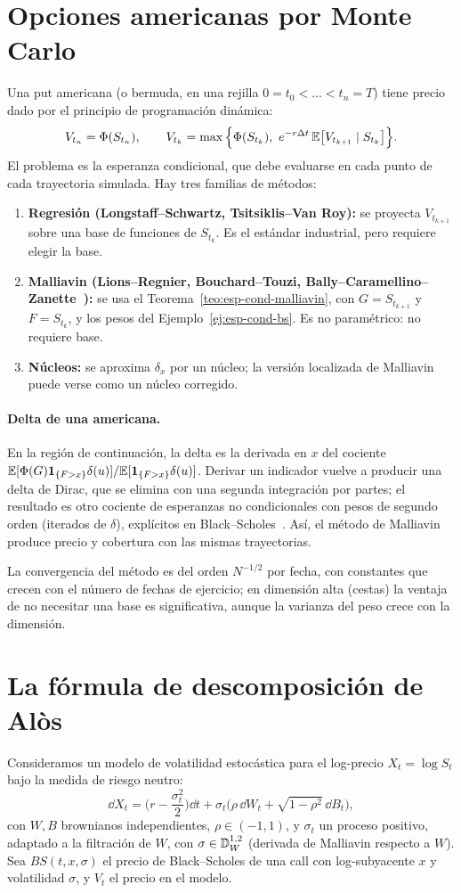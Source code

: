 \section{Opciones americanas por Monte Carlo}
Una put americana (o bermuda, en una rejilla $0=t_0<\dots<t_n=T$) tiene precio dado por el
principio de programación dinámica:
\[
  V_{t_n}=\Phi(S_{t_n}),\qquad V_{t_k}=\max\Big\{\Phi(S_{t_k}),\ e^{-r\Delta t}\,\mathbb{E}\big[V_{t_{k+1}}\mid S_{t_k}\big]\Big\}.
\]
El problema es la esperanza condicional, que debe evaluarse en cada punto de cada trayectoria
simulada. Hay tres familias de métodos:
\begin{enumerate}
  \item \textbf{Regresión (Longstaff--Schwartz, Tsitsiklis--Van Roy):} se proyecta $V_{t_{k+1}}$ sobre una
  base de funciones de $S_{t_k}$. Es el estándar industrial, pero requiere elegir la base.
  \item \textbf{Malliavin (Lions--Regnier, Bouchard--Touzi, Bally--Caramellino--Zanette~\cite{BallyCaramellinoZanette05}):}
  se usa el Teorema~\ref{teo:esp-cond-malliavin}, con $G=S_{t_{k+1}}$ y $F=S_{t_k}$, y los pesos del Ejemplo~\ref{ej:esp-cond-bs}. Es no
  paramétrico: no requiere base.
  \item \textbf{Núcleos:} se aproxima $\delta_x$ por un núcleo; la versión localizada de Malliavin puede verse
  como un núcleo corregido.
\end{enumerate}

\paragraph{Delta de una americana.} En la región de continuación, la delta es la derivada en $x$ del
cociente $\mathbb{E}[\Phi(G)\mathbf{1}_{\{F>x\}}\delta(u)]/\mathbb{E}[\mathbf{1}_{\{F>x\}}\delta(u)]$. Derivar un indicador vuelve a producir una delta
de Dirac, que se elimina con una segunda integración por partes; el resultado es otro cociente
de esperanzas no condicionales con pesos de segundo orden (iterados de $\delta$), explícitos en
Black--Scholes~\cite{BallyCaramellinoZanette05}. Así, el método de Malliavin produce precio y cobertura con las mismas
trayectorias.

La convergencia del método es del orden $N^{-1/2}$ por fecha, con constantes que crecen con el
número de fechas de ejercicio; en dimensión alta (cestas) la ventaja de no necesitar una base es
significativa, aunque la varianza del peso crece con la dimensión.

\section{La fórmula de descomposición de Alòs}
Consideramos un modelo de volatilidad estocástica para el log-precio $X_t=\log S_t$ bajo la medida
de riesgo neutro:
\[
  \dd X_t=\Big(r-\frac{\sigma_t^2}{2}\Big)\dd t+\sigma_t\Big(\rho\,\dd W_t+\sqrt{1-\rho^2}\,\dd B_t\Big),
\]
con $W,B$ brownianos independientes, $\rho\in(-1,1)$, y $\sigma_t$ un proceso positivo, adaptado a la
filtración de $W$, con $\sigma\in\mathbb{D}^{1,2}_W$ (derivada de Malliavin respecto a $W$). Sea $BS(t,x,\sigma)$ el precio
de Black--Scholes de una call con log-subyacente $x$ y volatilidad $\sigma$, y $V_t$ el precio en el modelo.

